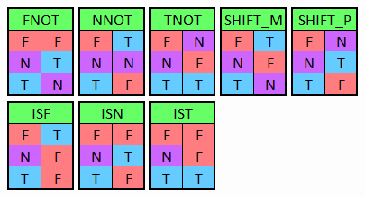 \documentclass[12pt]{article}
\begin{document}
\begin{figure}[h]
\includegraphics[scale=1]{Resources/FNOT.PNG}
\includegraphics[scale=1]{Resources/NNOT.PNG}
\includegraphics[scale=1]{Resources/TNOT.PNG}
\includegraphics[scale=1]{Resources/SHIFT_M.PNG}
\includegraphics[scale=1]{Resources/SHIFT_P.PNG}
\includegraphics[scale=1]{Resources/ISF.PNG}
\includegraphics[scale=1]{Resources/ISN.PNG}
\includegraphics[scale=1]{Resources/IST.PNG}
\end{figure}
\end{document}
